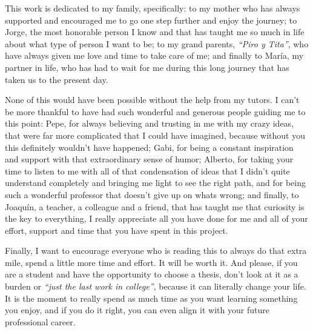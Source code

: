 \documentclass[11pt,english,a4paper,hidelinks]{book}
\begin{document}
\noindent This work is dedicated to my family, specifically: to my mother who has always supported and encouraged me to go one step further and enjoy the journey; to Jorge, the most honorable person I know and that has taught me so much in life about what type of person I want to be; to my grand parents, \textit{``Piro y Tita''}, who have always given me love and time to take care of me; and finally to María, my partner in life, who has had to wait for me during this long journey that has taken us to the present day.

\vspace{0.5cm}
\noindent None of this would have been possible without the help from my tutors. I can't be more thankful to have had such wonderful and generous people guiding me to this point: Pepe, for always believing and trusting in me with my crazy ideas, that were far more complicated that I could have imagined, because without you this definitely wouldn't have happened; Gabi, for being a constant inspiration and support with that extraordinary sense of humor; Alberto, for taking your time to listen to me with all of that condensation of ideas that I didn't quite understand completely and bringing me light to see the right path, and for being such a wonderful professor that doesn't give up on whats wrong; and finally, to Joaquín, a teacher, a colleague and a friend, that has taught me that curiosity is the key to everything, I really appreciate all you have done for me and all of your effort, support and time that you have spent in this project.

\vspace{0.5cm}
\noindent Finally, I want to encourage everyone who is reading this to always do that extra mile, spend a little more time and effort. It will be worth it. And please, if you are a student and have the opportunity to choose a thesis, don't look at it as a burden or \textit{``just the last work in college''}, because it can literally change your life. It is the moment to really spend as much time as you want learning something you enjoy, and if you do it right, you can even align it with your future professional career.

\tableofcontents
\newpage

\listoffigures
\newpage
\end{document}
